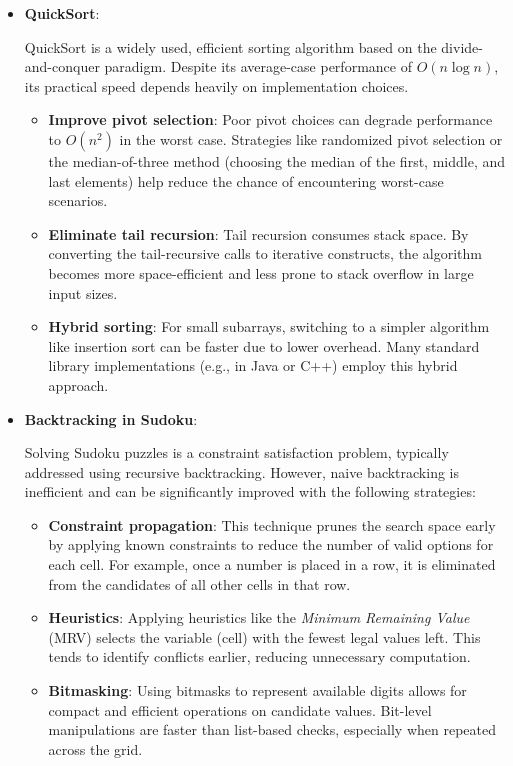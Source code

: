 \documentclass[12pt]{article}
\begin{document}
\begin{itemize}
    \item \textbf{QuickSort}:

    QuickSort is a widely used, efficient sorting algorithm based on the divide-and-conquer paradigm. Despite its average-case performance of \(O(n \log n)\), its practical speed depends heavily on implementation choices.

    \begin{itemize}
        \item \textbf{Improve pivot selection}: Poor pivot choices can degrade performance to \(O(n^2)\) in the worst case. Strategies like randomized pivot selection or the median-of-three method (choosing the median of the first, middle, and last elements) help reduce the chance of encountering worst-case scenarios.
        \item \textbf{Eliminate tail recursion}: Tail recursion consumes stack space. By converting the tail-recursive calls to iterative constructs, the algorithm becomes more space-efficient and less prone to stack overflow in large input sizes.
        \item \textbf{Hybrid sorting}: For small subarrays, switching to a simpler algorithm like insertion sort can be faster due to lower overhead. Many standard library implementations (e.g., in Java or C++) employ this hybrid approach.
    \end{itemize}

    \item \textbf{Backtracking in Sudoku}:

    Solving Sudoku puzzles is a constraint satisfaction problem, typically addressed using recursive backtracking. However, naive backtracking is inefficient and can be significantly improved with the following strategies:

    \begin{itemize}
        \item \textbf{Constraint propagation}: This technique prunes the search space early by applying known constraints to reduce the number of valid options for each cell. For example, once a number is placed in a row, it is eliminated from the candidates of all other cells in that row.
        \item \textbf{Heuristics}: Applying heuristics like the \emph{Minimum Remaining Value} (MRV) selects the variable (cell) with the fewest legal values left. This tends to identify conflicts earlier, reducing unnecessary computation.
        \item \textbf{Bitmasking}: Using bitmasks to represent available digits allows for compact and efficient operations on candidate values. Bit-level manipulations are faster than list-based checks, especially when repeated across the grid.
    \end{itemize}
\end{itemize}
\end{document}
